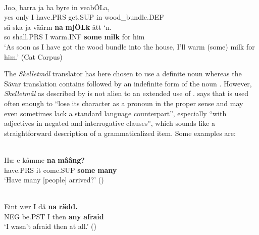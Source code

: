 
\ea \label{} 
\\
\gll Joo,  barra  ja  ha  byre  in  veabÖLa,  \\
yes  only  I  have.PRS  get.SUP  in  wood\_bundle.DEF  \\
\gll sä  ska  ja  väärm  \textbf{na} \textbf{mjÖLk} ått  ‘n.\\
so  shall.PRS  I  warm.INF  \textbf{some} \textbf{milk} for   him\\
\glt ‘As soon as I have got the wood bundle into the house, I’ll warm (some) milk for him.’ (Cat Corpus)

\z

The \textit{Skelletmål} translator has here chosen to use a definite noun whereas the Sävar translation contains followed by an indefinite form of the noun . However, \textit{Skelletmål} as described by \citet{Marklund1976} is not alien to an extended use of . \citet[43]{Marklund1976} says that  is used often enough to “lose its character as a pronoun in the proper sense and may even sometimes lack a standard language counterpart”, especially “with adjectives in negated and interrogative clauses”, which sounds like a straightforward description of a grammaticalized item. Some examples are:


\ea \label{} 
\\
\gll Hæ  e  kåmme  \textbf{na} \textbf{  mââng?}\\
have.PRS  it  come.SUP  \textbf{some} \textbf{many}\\
\glt ‘Have many [people] arrived?’ (\citet[43]{Marklund1976})

\z

\ea \label{} 
\\
\gll Eint  vær  I  dâ  \textbf{na} \textbf{rädd.}\\
NEG  be.PST  I  then  \textbf{any} \textbf{afraid}\\
\glt ‘I wasn’t afraid then at all.’ (\citet[43]{Marklund1976})

\z

